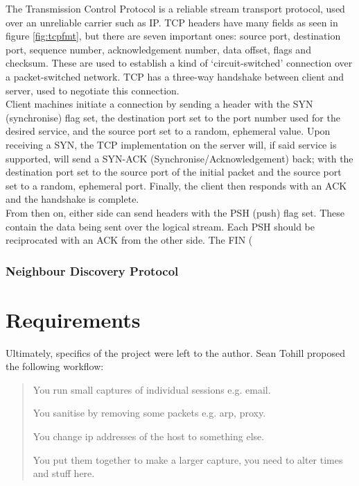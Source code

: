 \documentclass[10pt,a4paper,notitlepage,twoside]{report}
\begin{document}
The Transmission Control Protocol is a reliable stream transport protocol, used over an unreliable carrier such as IP. TCP headers have many fields as seen in figure \ref{fig:tcpfmt}, but there are seven important ones: source port, destination port, sequence number, acknowledgement number, data offset, flags and checksum. These are used to establish a kind of `circuit-switched' connection over a packet-switched network. TCP has a three-way handshake between client and server, used to negotiate this connection.\\

Client machines initiate a connection by sending a header with the SYN (synchronise) flag set, the destination port set to the port number used for the desired service, and the source port set to a random, ephemeral value.
Upon receiving a SYN, the TCP implementation on the server will, if said service is supported, will send a SYN-ACK (Synchronise/Acknowledgement) back; with the destination port set to the source port of the initial packet and the source port set to a random, ephemeral port. Finally, the client then responds with an ACK and the handshake is complete.\\

From then on, either side can send headers with the PSH (push) flag set. These contain the data being sent over the logical stream. Each PSH should be reciprocated with an ACK from the other side. The FIN (

\subsection{Neighbour Discovery Protocol}
\label{sec:ndp}

\chapter{Requirements}
Ultimately, specifics of the project were left to the author. Sean Tohill proposed the following workflow:

\begin{quote}
You run small captures of individual sessions e.g. email.

You sanitise by removing some packets e.g. arp, proxy.

You change ip addresses of the host to something else.

You put them together to make a larger capture, you need to alter times and stuff here.

\end{quote}
\end{document}
